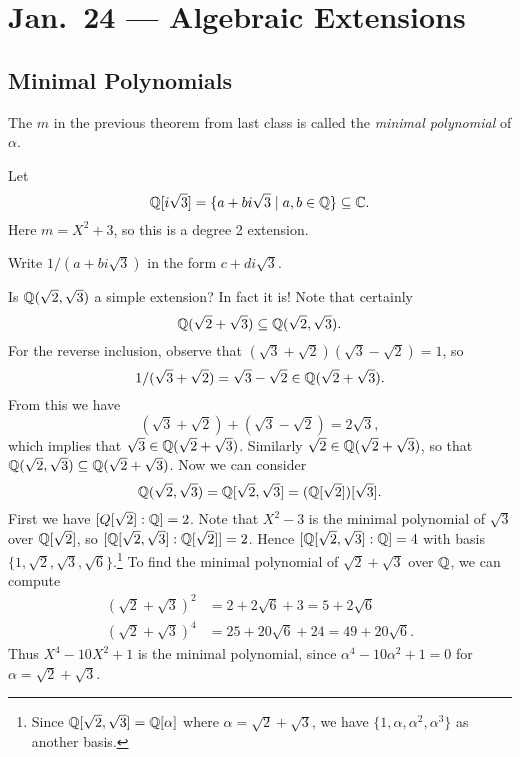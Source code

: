 \chapter{Jan.~24 --- Algebraic Extensions}

\section{Minimal Polynomials}
\begin{remark}
  The $m$ in the previous theorem from last class is
  called the \emph{minimal polynomial} of $\alpha$.
\end{remark}

\begin{example}
  Let 
  \[\mathbb{Q}[i\sqrt{3}] = \{a + bi\sqrt{3} \mid a, b \in \mathbb{Q}\} \subseteq \mathbb{C}.\]
  Here $m = X^2 + 3$, so this is a degree 2 extension.
\end{example}

\begin{exercise}
Write $1 / (a + bi\sqrt{3})$ in the form $c + di\sqrt{3}$.
\end{exercise}

\begin{example}
  Is $\mathbb{Q}(\sqrt{2}, \sqrt{3})$ a simple extension?
  In fact it is! Note that certainly
  \[
    \mathbb{Q}(\sqrt{2} + \sqrt{3}) \subseteq \mathbb{Q}(\sqrt{2}, \sqrt{3}).
  \]
  For the reverse inclusion, observe that
  $(\sqrt{3} + \sqrt{2})(\sqrt{3} - \sqrt{2}) = 1$,
  so
  \[1 / (\sqrt{3} + \sqrt{2}) = \sqrt{3} - \sqrt{2} \in \mathbb{Q}(\sqrt{2} + \sqrt{3}).\]
  From this we have
  \[
    (\sqrt{3} + \sqrt{2}) + (\sqrt{3} - \sqrt{2})
    = 2\sqrt{3},
  \]
  which implies that $\sqrt{3} \in \mathbb{Q}(\sqrt{2} + \sqrt{3})$.
  Similarly $\sqrt{2} \in \mathbb{Q}(\sqrt{2} + \sqrt{3})$, so that
  $\mathbb{Q}(\sqrt{2}, \sqrt{3}) \subseteq \mathbb{Q}(\sqrt{2} + \sqrt{3})$.
  Now we can consider
  \[\mathbb{Q}(\sqrt{2}, \sqrt{3}) = \mathbb{Q}[\sqrt{2}, \sqrt{3}] = (\mathbb{Q}[\sqrt{2}])[\sqrt{3}].\]
  First we have $[Q[\sqrt{2}]:\mathbb{Q}] = 2$. Note that
  $X^2 - 3$ is the minimal polynomial of
  $\sqrt{3}$ over $\mathbb{Q}[\sqrt{2}]$, so
  $[\mathbb{Q}[\sqrt{2}, \sqrt{3}]:\mathbb{Q}[\sqrt{2}]] = 2$.
  Hence $[\mathbb{Q}[\sqrt{2}, \sqrt{3}]:\mathbb{Q}] = 4$ with
  basis $\{1, \sqrt{2}, \sqrt{3}, \sqrt{6}\}$.\footnote{Since $\mathbb{Q}[\sqrt{2}, \sqrt{3}] = \mathbb{Q}[\alpha]$ where $\alpha = \sqrt{2} + \sqrt{3}$, we have $\{1, \alpha, \alpha^2, \alpha^3\}$ as another basis.}
  To find the  minimal polynomial of
  $\sqrt{2} + \sqrt{3}$ over $\mathbb{Q}$, we can compute
  \begin{align*}
    (\sqrt{2} + \sqrt{3})^2
    &= 2 + 2\sqrt{6} + 3 = 5 + 2\sqrt{6} \\
    (\sqrt{2} + \sqrt{3})^4
    &= 25 + 20\sqrt{6} + 24 = 49 + 20\sqrt{6}.
  \end{align*}
  Thus $X^4 - 10X^2 + 1$ is the minimal polynomial,
  since $\alpha^4 - 10\alpha^2 + 1 = 0$ for
  $\alpha = \sqrt{2} + \sqrt{3}$.
\end{example}

